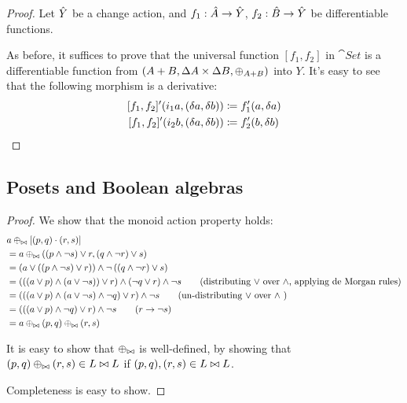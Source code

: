 \coproducts*
\begin{proof}
  \label{prf:coproducts}
  Let $\hat{Y}$ be a change action, and $f_1 : \hat{A} \rightarrow \hat{Y}$, $f_2 : \hat{B}
  \rightarrow \hat{Y}$ be differentiable functions.

  As before, it suffices to prove that the universal function $[f_1, f_2]$ in $\cat{Set}$ is a differentiable
  function from $(A + B,\Delta A \times \Delta B,\oplus_{A + B})$ into $Y$. It's easy to see
  that the following morphism is a derivative:
  \begin{align*}
    \derive{[f_1, f_2]} (i_1 a, (\change{a}, \change{b})) &\defeq f_1'(a, \change{a})\\
    \derive{[f_1, f_2]} (i_2 b, (\change{a}, \change{b})) &\defeq f_2'(b, \change{b})
  \end{align*}
\end{proof}

\subsection{Posets and Boolean algebras}

\lsuperpose*
\begin{proof}
  \label{prf:lsuperpose}
  We show that the monoid action property holds:
  \begin{align*}
    &a \oplus_{\bowtie} \left[(p, q) \cdot (r, s)\right]\\
    &= a \oplus_{\bowtie} ((p \wedge \neg s) \vee r, (q \wedge \neg r) \vee s)\\
    &= \left(
      a \vee
      \left(
        \left(
          p \wedge \neg s
        \right)
        \vee r
      \right)
    \right)
    \wedge \neg
    \left(
      \left(
        q \wedge \neg r
      \right)
      \vee s
    \right)\\
    &= \left(
      \left(
        \left(
          a \vee p
        \right)
        \wedge
        \left(
          a \vee \neg s
        \right)
      \right)
      \vee r
    \right)
    \wedge
    \left(
      \neg q \vee r
    \right)
    \wedge
    \neg s
    \tag{distributing $\vee$ over $\wedge$, applying de Morgan rules}\\
    &= \left(
      \left(
        \left(
          a \vee p
        \right)
        \wedge
        \left(
          a \vee \neg s
        \right)
        \wedge
        \neg q
      \right)
      \vee r
    \right)
    \wedge
    \neg s
    \tag{un-distributing $\vee$ over $\wedge$ }\\
    &= \left(
      \left(
        \left(
          a \vee p
        \right)
        \wedge
        \neg q
      \right)
      \vee r
    \right)
    \wedge
    \neg s
    \tag{$r \rightarrow \neg s$}\\
    &= a \oplus_{\bowtie} (p, q) \oplus_{\bowtie} (r, s)
  \end{align*}

  It is easy to show that $\oplus_{\bowtie}$ is well-defined, by showing that $(p,q)
  \oplus_{\bowtie} (r, s) \in L \bowtie L$ if $(p, q), (r,s) \in L \bowtie L$.

  Completeness is easy to show.
\end{proof}

